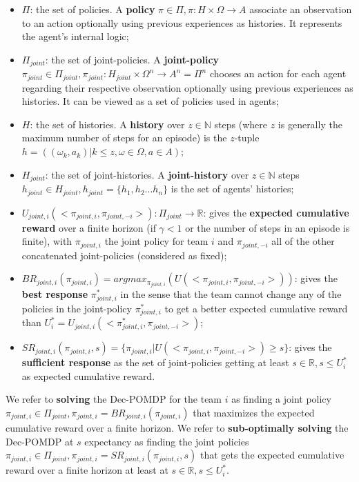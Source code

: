\documentclass[runningheads]{llncs}
\begin{document}
\begin{itemize}

    \item $\Pi$: the set of policies. A \textbf{policy} $\pi \in \Pi, \pi: H \times \Omega \rightarrow A$ associate an observation to an action optionally using previous experiences as histories. It represents the agent's internal logic;
    \item $\Pi_{joint}$: the set of joint-policies. A \textbf{joint-policy} $\pi_{joint} \in \Pi_{joint}, \pi_{joint}: H_{joint} \times \Omega^n \rightarrow A^n = \Pi^n$ chooses an action for each agent regarding their respective observation optionally using previous experiences as histories. It can be viewed as a set of policies used in agents;
    \item $H$: the set of histories. A \textbf{history} over $z \in \mathbb{N}$ steps (where $z$ is generally the maximum number of steps for an episode) is the $z$-tuple $h = ((\omega_{k}, a_{k}) | k \leq z, \omega \in \Omega, a \in A)$;
    \item $H_{joint}$: the set of joint-histories. A \textbf{joint-history} over $z \in \mathbb{N}$ steps $h_{joint} \in H_{joint}, h_{joint} = \{h_1,h_2...h_n\}$ is the set of agents' histories;
    \item $U_{joint,i}(<\pi_{joint,i}, \pi_{joint,-i}>): \Pi_{joint} \rightarrow \mathbb{R}$: gives the \textbf{expected cumulative reward} over a finite horizon (if $\gamma < 1$ or the number of steps in an episode is finite), with $\pi_{joint,i}$ the joint policy for team $i$ and $\pi_{joint,-i}$ all of the other concatenated joint-policies (considered as fixed);
    \item $BR_{joint,i}(\pi_{joint,i}) = argmax_{\pi_{joint,i}}(U(<\pi_{joint,i},\pi_{joint,-i}>))$: gives the \textbf{best response} $\pi_{joint,i}^*$ in the sense that the team cannot change any of the policies in the joint-policy $\pi_{joint,i}^*$ to get a better expected cumulative reward than $U_i^* = U_{joint,i}(<\pi_{joint,i}^*, \pi_{joint,-i}>)$;
    \item $SR_{joint,i}(\pi_{joint,i}, s) = \{\pi_{joint,i} | U(<\pi_{joint,i},\pi_{joint,-i}>) \geq s\}$: gives the \textbf{sufficient response} as the set of joint-policies getting at least $s \in \mathbb{R}, s \leq U_i^*$ as expected cumulative reward.
\end{itemize}

We refer to \textbf{solving} the Dec-POMDP for the team $i$ as finding a joint policy $\pi_{joint,i} \in \Pi_{joint}, \pi_{joint,i} = BR_{joint,i}(\pi_{joint,i})$ that maximizes the expected cumulative reward over a finite horizon.
We refer to \textbf{sub-optimally solving} the Dec-POMDP at $s$ expectancy as finding the joint policies $\pi_{joint,i} \in \Pi_{joint}, \pi_{joint,i} = SR_{joint,i}(\pi_{joint,i}, s)$ that gets the expected cumulative reward over a finite horizon at least at $s \in \mathbb{R}, s \leq U_i^*$.
\end{document}
